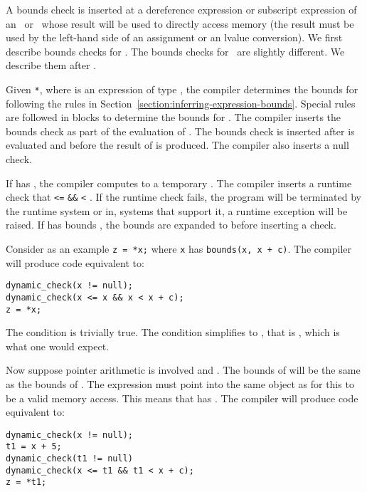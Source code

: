 A bounds check is inserted at a dereference expression or subscript expression
of an \arrayptr\ or \ntarrayptr\ whose result will be used to directly
access memory (the result must be used by the left-hand side of an
assignment or an lvalue conversion).   We first describe bounds checks
for \arrayptr.   The bounds checks for \ntarrayptr\ are slightly
different.  We describe them after \arrayptr.

Given \lstinline|*|, where  is an expression of type
\arrayptr, the compiler determines the bounds for 
following the rules in Section~\ref{section:inferring-expression-bounds}.
Special rules are followed in
 blocks to determine the bounds for . The
compiler inserts the bounds check as part of the evaluation of .
The bounds check is inserted after  is evaluated and before the result of
 is produced.  The compiler also inserts a null check.

If {} has {}, the compiler
computes  to a temporary .   The compiler inserts a runtime check that
 \lstinline|<=|  \lstinline|&&|
 \lstinline|<| . If the runtime check fails, the program
will be terminated by the runtime system or in, systems that support it,
a runtime exception will be raised.   If {} has bounds {},
the bounds are expanded to  before inserting a check.

Consider as an example \lstinline|z = *x;| where
\lstinline|x| has \lstinline|bounds(x, x + c)|. The compiler will produce code equivalent to:
\begin{lstlisting}
dynamic_check(x != null);
dynamic_check(x <= x && x < x + c);
z = *x;
\end{lstlisting}
The condition  is trivially true. The
condition  simplifies to , that is , which is what one
would expect.

Now suppose pointer arithmetic is involved and . The
bounds of  will be the same as the bounds of .
The expression  must point into the same object as
 for this to be a valid memory access. This means that
{} has {}.
The compiler will produce code equivalent to:

\begin{lstlisting}
dynamic_check(x != null);
t1 = x + 5;
dynamic_check(t1 != null)
dynamic_check(x <= t1 && t1 < x + c);
z = *t1;
\end{lstlisting}

